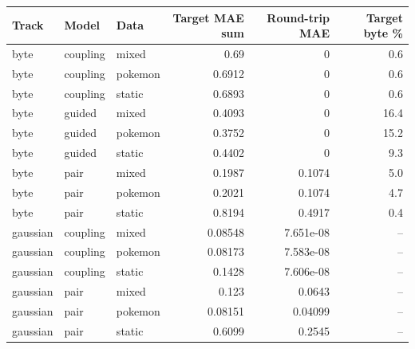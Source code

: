 \begin{tabular}{lllrrr}
\toprule
Track & Model & Data & Target MAE sum & Round-trip MAE & Target byte \% \\
\midrule
byte & coupling & mixed & 0.69 & 0 & 0.6 \\
byte & coupling & pokemon & 0.6912 & 0 & 0.6 \\
byte & coupling & static & 0.6893 & 0 & 0.6 \\
byte & guided & mixed & 0.4093 & 0 & 16.4 \\
byte & guided & pokemon & 0.3752 & 0 & 15.2 \\
byte & guided & static & 0.4402 & 0 & 9.3 \\
byte & pair & mixed & 0.1987 & 0.1074 & 5.0 \\
byte & pair & pokemon & 0.2021 & 0.1074 & 4.7 \\
byte & pair & static & 0.8194 & 0.4917 & 0.4 \\
gaussian & coupling & mixed & 0.08548 & 7.651e-08 & -- \\
gaussian & coupling & pokemon & 0.08173 & 7.583e-08 & -- \\
gaussian & coupling & static & 0.1428 & 7.606e-08 & -- \\
gaussian & pair & mixed & 0.123 & 0.0643 & -- \\
gaussian & pair & pokemon & 0.08151 & 0.04099 & -- \\
gaussian & pair & static & 0.6099 & 0.2545 & -- \\
\bottomrule
\end{tabular}
